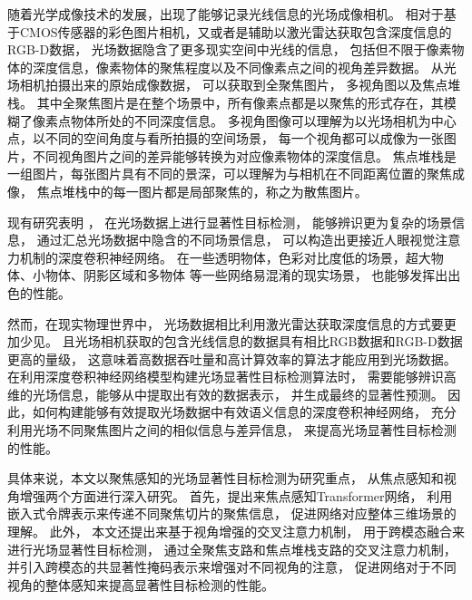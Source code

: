 随着光学成像技术的发展，出现了能够记录光线信息的光场成像相机。
相对于基于CMOS传感器的彩色图片相机，又或者是辅助以激光雷达获取包含深度信息的RGB-D数据，
光场数据隐含了更多现实空间中光线的信息，
包括但不限于像素物体的深度信息，像素物体的聚焦程度以及不同像素点之间的视角差异数据。
从光场相机拍摄出来的原始成像数据，
可以获取到全聚焦图片，
多视角图以及焦点堆栈。
其中全聚焦图片是在整个场景中，所有像素点都是以聚焦的形式存在，其模糊了像素点物体所处的不同深度信息。
多视角图像可以理解为以光场相机为中心点，以不同的空间角度与看所拍摄的空间场景，
每一个视角都可以成像为一张图片，不同视角图片之间的差异能够转换为对应像素物体的深度信息。
焦点堆栈是一组图片，每张图片具有不同的景深，可以理解为与相机在不同距离位置的聚焦成像，
焦点堆栈中的每一图片都是局部聚焦的，称之为散焦图片。





现有研究表明
，
在光场数据上进行显著性目标检测，
能够辨识更为复杂的场景信息，
通过汇总光场数据中隐含的不同场景信息，
可以构造出更接近人眼视觉注意力机制的深度卷积神经网络。
在一些透明物体，色彩对比度低的场景，超大物体、小物体、阴影区域和多物体
等一些网络易混淆的现实场景，
也能够发挥出出色的性能。


然而，在现实物理世界中，
光场数据相比利用激光雷达获取深度信息的方式要更加少见。
且光场相机获取的包含光线信息的数据具有相比RGB数据和RGB-D数据更高的量级，
这意味着高数据吞吐量和高计算效率的算法才能应用到光场数据。
在利用深度卷积神经网络模型构建光场显著性目标检测算法时，
需要能够辨识高维的光场信息，能够从中提取出有效的数据表示，
并生成最终的显著性预测。
因此，如何构建能够有效提取光场数据中有效语义信息的深度卷积神经网络，
充分利用光场不同聚焦图片之间的相似信息与差异信息，
来提高光场显著性目标检测的性能。






具体来说，本文以聚焦感知的光场显著性目标检测为研究重点，
从焦点感知和视角增强两个方面进行深入研究。
首先，提出来焦点感知Transformer网络，
利用嵌入式令牌表示来传递不同聚焦切片的聚焦信息，
促进网络对应整体三维场景的理解。
此外，
本文还提出来基于视角增强的交叉注意力机制，
用于跨模态融合来进行光场显著性目标检测，
通过全聚焦支路和焦点堆栈支路的交叉注意力机制，
并引入跨模态的共显著性掩码表示来增强对不同视角的注意，
促进网络对于不同视角的整体感知来提高显著性目标检测的性能。





